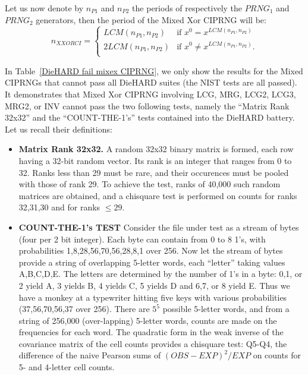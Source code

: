 \documentclass[10pt, conference, compsocconf]{IEEEtran}
\begin{document}
Let us now denote by $n_{P1}$ and $n_{P2}$ the periods of respectively the $PRNG_1$ and $PRNG_2$ generators, then the period of the Mixed Xor CIPRNG will be:
\begin{equation}
n_{XXORCI}=
\left\{
\begin{array}{ll}
LCM(n_{P1},n_{P2})&\text{if~}x^0=x^{LCM(n_{P1},n_{P2})}\\
2LCM(n_{P1},n_{P2})&\text{if~}x^0\neq x^{LCM(n_{P1},n_{P2})}.\\
\end{array}
\right.
\label{equation Oplus}
\end{equation}

In Table~\ref{DieHARD fail mixex CIPRNG}, we only show the results for the Mixed CIPRNGs that cannot pass all DieHARD suites (the NIST tests are all passed). It demonstrates that Mixed Xor CIPRNG involving LCG, MRG, LCG2, LCG3, MRG2, or INV cannot pass the two following tests, namely the ``Matrix Rank 32x32'' and the ``COUNT-THE-1's'' tests contained into the DieHARD battery. Let us recall their definitions:

\begin{itemize}
 \item \textbf{Matrix Rank 32x32.} A random 32x32 binary matrix is formed, each row having a 32-bit random vector. Its rank is an integer that ranges from 0 to 32. Ranks less than 29 must be rare, and their occurences must be pooled with those of rank 29. To achieve the test, ranks of 40,000 such random matrices are obtained, and a chisquare test is performed on counts for ranks 32,31,30 and for ranks $\leq29$.

 \item \textbf{COUNT-THE-1's TEST} Consider the file under test as a stream of bytes (four per  2 bit integer).  Each byte can contain from 0 to 8 1's, with probabilities 1,8,28,56,70,56,28,8,1 over 256.  Now let the stream of bytes provide a string of overlapping  5-letter words, each ``letter'' taking values A,B,C,D,E. The letters are determined by the number of 1's in a byte: 0,1, or 2 yield A, 3 yields B, 4 yields C, 5 yields D and 6,7, or 8 yield E. Thus we have a monkey at a typewriter hitting five keys with various probabilities (37,56,70,56,37 over 256).  There are $5^5$ possible 5-letter words, and from a string of 256,000 (over-lapping) 5-letter words, counts are made on the frequencies for each word.   The quadratic form in the weak inverse of the covariance matrix of the cell counts provides a chisquare test: Q5-Q4, the difference of the naive Pearson sums of $(OBS-EXP)^2/EXP$ on counts for 5- and 4-letter cell counts.
\end{itemize}
\end{document}
